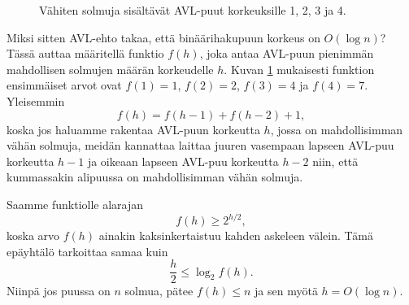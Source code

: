 \begin{figure}
\center
\scriptsize
{}
\caption{Vähiten solmuja sisältävät AVL-puut korkeuksille 1, 2, 3 ja 4.}
\label{fig:avlkor}
\end{figure}

Miksi sitten AVL-ehto takaa, että binäärihakupuun korkeus
on $O(\log n)$?
Tässä auttaa määritellä funktio $f(h)$, joka antaa AVL-puun
pienimmän mahdollisen solmujen määrän korkeudelle $h$.
Kuvan \ref{fig:avlkor} mukaisesti funktion ensimmäiset arvot
ovat $f(1)=1$, $f(2)=2$, $f(3)=4$ ja $f(4)=7$.
Yleisemmin
\[f(h)=f(h-1)+f(h-2)+1,\]
koska jos haluamme rakentaa AVL-puun korkeutta $h$,
jossa on mahdollisimman vähän solmuja,
meidän kannattaa laittaa juuren vasempaan
lapseen AVL-puu korkeutta $h-1$ ja oikeaan lapseen
AVL-puu korkeutta $h-2$ niin,
että kummassakin alipuussa on mahdollisimman vähän solmuja.

Saamme funktiolle alarajan
\[f(h) \ge 2^{h/2},\]
koska arvo $f(h)$ ainakin kaksinkertaistuu kahden askeleen välein.
Tämä epä\-yhtälö tarkoittaa samaa kuin
\[ \frac{h}{2} \le \log_2 f(h).\]
Niinpä jos puussa on $n$ solmua, pätee $f(h) \le n$ ja sen myötä $h = O(\log n)$.

